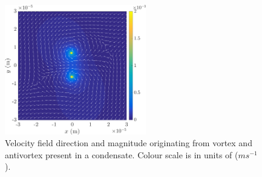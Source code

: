 \begin{figure}\centering
    \includegraphics[width=0.55\textwidth]{Images/ch4_vtx/vtx_anti_velfield}
    \caption{Velocity field direction and magnitude originating from vortex and antivortex present in a condensate. Colour scale is in units of ($ms^{-1}$).}
    \label{fig:vel_pm}
\end{figure}

